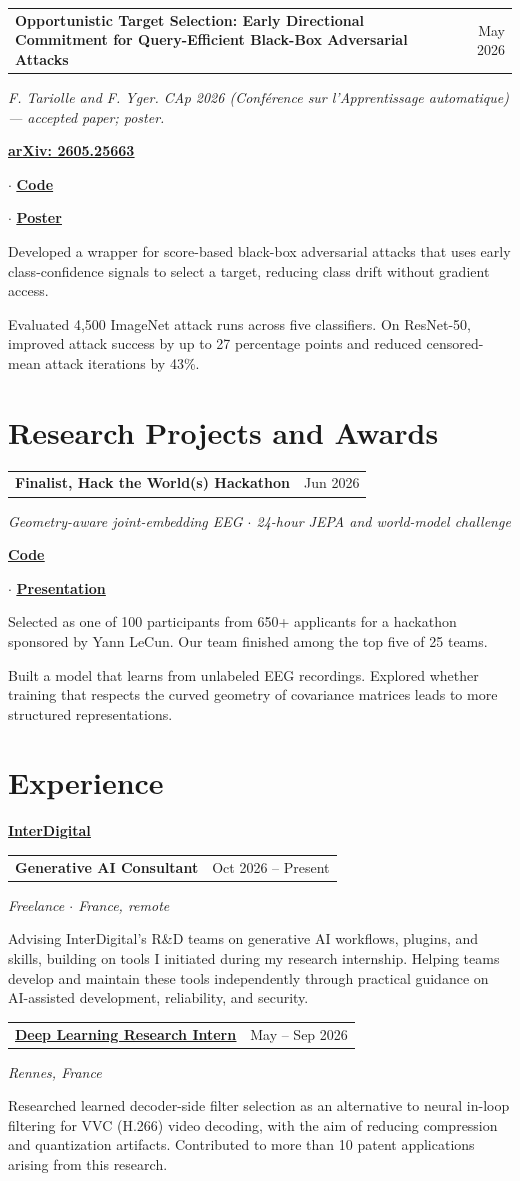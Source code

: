 \documentclass[11pt,a4paper]{article}
\makeatletter
\let\plainhref\href
\renewcommand{\href}[2]{%
  \plainhref{#1}{\uline{#2}}%
}
\newcommand{\entry}[3]{%
  \Needspace{5\baselineskip}%
  \vspace{3pt}%
  {\setlength{\parskip}{0pt}%
    \begin{tabularx}{\linewidth}{@{}>{\raggedright\arraybackslash}Xr@{}}%
      \textbf{#1} & {\small\color{muted} #2}\\%
    \end{tabularx}\par\nobreak
    {\small\color{muted}\textit{#3}}\par\nobreak
  }\vspace{2pt}\nobreak
}
\newenvironment{employment}[2]{%
  \Needspace{8\baselineskip}%
  \vspace{3pt}%
  {\setlength{\parskip}{0pt}%
    \textbf{\color{accent}\href{#2}{#1}}\par\nobreak
  }%
  \begin{list}{}{%
    \setlength{\leftmargin}{12pt}%
    \setlength{\rightmargin}{0pt}%
    \setlength{\topsep}{0pt}%
    \setlength{\partopsep}{0pt}%
    \setlength{\parsep}{4pt}%
    \setlength{\itemsep}{0pt}%
  }%
  \item\relax
}{%
  \end{list}%
}
\newcommand{\resourcelink}[2]{%
  \href{#1}{\textbf{#2}}%
}
\newcommand{\resourcelinks}[1]{%
  {\setlength{\parskip}{0pt}%
    \par{\small #1}\par\nobreak
  }%
}
\newcommand{\entrygap}{\par\addvspace{6pt}}
\newenvironment{highlights}{%
  \begin{list}{\textbullet}{%
    \setlength{\leftmargin}{12pt}%
    \setlength{\labelsep}{5pt}%
    \setlength{\topsep}{2pt}%
    \setlength{\partopsep}{0pt}%
    \setlength{\parsep}{0pt}%
    \setlength{\itemsep}{2pt}%
  }%
}{%
  \end{list}%
}
\makeatother
\begin{document}
\entrygap
\entry{Opportunistic Target Selection: Early Directional Commitment for Query-Efficient Black-Box Adversarial Attacks}{May 2026}{F. Tariolle and F. Yger. CAp 2026 (Conf\'erence sur l'Apprentissage automatique) --- accepted paper; poster.}
\resourcelinks{\resourcelink{https://arxiv.org/abs/2605.25663}{arXiv: 2605.25663}
  \enspace$\cdot$\enspace
  \resourcelink{https://github.com/Tariolle/opportunistic-target-selection}{Code}
  \enspace$\cdot$\enspace
  \resourcelink{https://github.com/Tariolle/opportunistic-target-selection/blob/main/poster/poster_beamer.pdf}{Poster}}
\begin{highlights}
  \item Developed a wrapper for score-based black-box adversarial attacks that uses
    early class-confidence signals to select a target, reducing class drift without
    gradient access.
  \item Evaluated 4,500 ImageNet attack runs across five classifiers.
    On ResNet-50, improved attack success by up to 27 percentage points and
    reduced censored-mean attack iterations by 43\%.
\end{highlights}

\section*{Research Projects and Awards}
\entry{Finalist, Hack the World(s) Hackathon}{Jun 2026}{Geometry-aware joint-embedding EEG $\cdot$ 24-hour JEPA and world-model challenge}
\resourcelinks{\resourcelink{https://github.com/Tariolle/hello-worlds}{Code}
  \enspace$\cdot$\enspace
  \resourcelink{https://github.com/Tariolle/hello-worlds/blob/main/presentation/main.pdf}{Presentation}}
Selected as one of 100 participants from 650+ applicants for a hackathon sponsored
by Yann LeCun. Our team finished among the top five of 25 teams.

Built a model that learns from unlabeled EEG recordings. Explored whether
training that respects the curved geometry of covariance matrices leads to
more structured representations.

\newpage
\section*{Experience}
\begin{employment}{InterDigital}{https://www.interdigital.com/}
\entry{Generative AI Consultant}{Oct 2026 -- Present}{Freelance $\cdot$ France, remote}
Advising InterDigital's R\&D teams on generative AI workflows, plugins, and skills,
building on tools I initiated during my research internship. Helping teams develop
and maintain these tools independently through practical guidance on AI-assisted
development, reliability, and security.

\entrygap
\entry{\href{https://www.interdigital.com/video-lab/video-codec-research}{Deep Learning Research Intern}}{May -- Sep 2026}{Rennes, France}
Researched learned decoder-side filter selection as an alternative to neural
in-loop filtering for VVC (H.266) video decoding, with the aim of reducing
compression and quantization artifacts. Contributed to more than 10 patent
applications arising from this research.
\end{employment}
\end{document}
